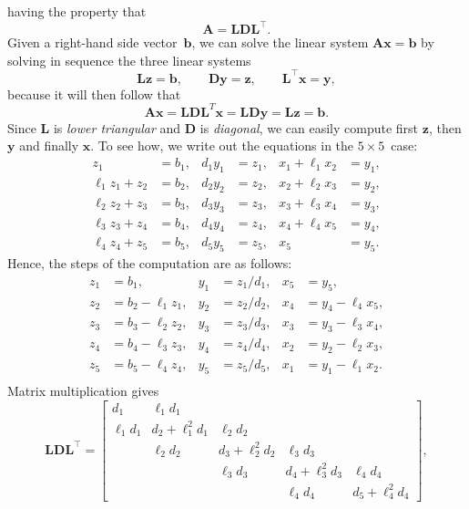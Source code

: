 having the property that
\begin{equation}\label{eq: L D LT}
\boldsymbol{A}=\boldsymbol{L}\boldsymbol{D}\boldsymbol{L}^\top.
\end{equation}
Given a right-hand side vector~$\boldsymbol{b}$, we can solve the linear system
$\boldsymbol{A}\boldsymbol{x}=\boldsymbol{b}$ by solving in sequence the three
linear systems
\begin{equation}\label{eq: LDLT systems}
\boldsymbol{L}\boldsymbol{z}=\boldsymbol{b},\qquad
\boldsymbol{D}\boldsymbol{y}=\boldsymbol{z},\qquad
\boldsymbol{L}^\top\boldsymbol{x}=\boldsymbol{y},
\end{equation}
because it will then follow that
\[
\boldsymbol{A}\boldsymbol{x}
    =\boldsymbol{L}\boldsymbol{D}\boldsymbol{L}^T\boldsymbol{x}
    =\boldsymbol{L}\boldsymbol{D}\boldsymbol{y}
    =\boldsymbol{L}\boldsymbol{z}=\boldsymbol{b}.
\]
Since $\boldsymbol{L}$ is \emph{lower triangular} and $\boldsymbol{D}$ is 
\emph{diagonal}, we can easily compute first $\boldsymbol{z}$, then 
$\boldsymbol{y}$ and finally $\boldsymbol{x}$.  To see how, we write out the 
equations in the $5\times5$~case:
\begin{align*}
      z_1    &=b_1,& d_1y_1&=z_1,& x_1+\ell_1 x_2&=y_1,\\
\ell_1z_1+z_2&=b_2,& d_2y_2&=z_2,& x_2+\ell_2 x_3&=y_2,\\
\ell_2z_2+z_3&=b_3,& d_3y_3&=z_3,& x_3+\ell_3 x_4&=y_3,\\
\ell_3z_3+z_4&=b_4,& d_4y_4&=z_4,& x_4+\ell_4 x_5&=y_4,\\
\ell_4z_4+z_5&=b_5,& d_5y_5&=z_5,& x_5           &=y_5.
\end{align*}
Hence, the steps of the computation are as follows:
\begin{align*}
z_1&=b_1,           & y_1&=z_1/d_1,& x_5&=y_5,\\
z_2&=b_2-\ell_1 z_1,& y_2&=z_2/d_2,& x_4&=y_4-\ell_4x_5,\\
z_3&=b_3-\ell_2 z_2,& y_3&=z_3/d_3,& x_3&=y_3-\ell_3x_4,\\
z_4&=b_4-\ell_3 z_3,& y_4&=z_4/d_4,& x_2&=y_2-\ell_2x_3,\\
z_5&=b_5-\ell_4 z_4,& y_5&=z_5/d_5,& x_1&=y_1-\ell_1x_2.\\
\end{align*}
Matrix multiplication gives
\[
\boldsymbol{L}\boldsymbol{D}\boldsymbol{L}^\top=\begin{bmatrix}
      d_1&      \ell_1d_1&               &               &         \\
\ell_1d_1&d_2+\ell_1^2d_1&      \ell_2d_2&               &         \\
         &      \ell_2d_2&d_3+\ell_2^2d_2&      \ell_3d_3&         \\
         &               &      \ell_3d_3&d_4+\ell_3^2d_3&\ell_4d_4\\
         &               &               &      \ell_4d_4&d_5+\ell_4^2d_4
\end{bmatrix},
\]
